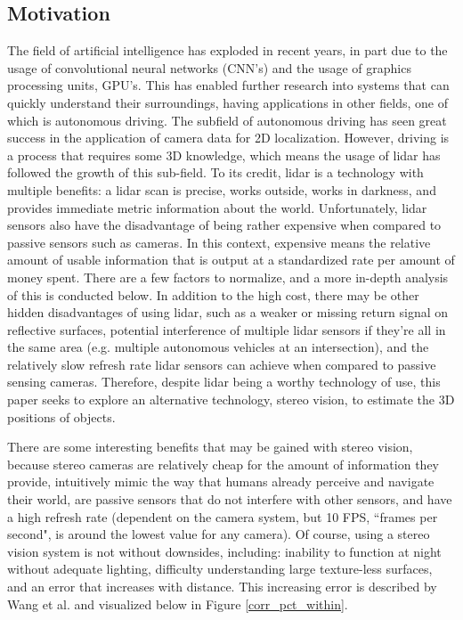 \subsection{Motivation}
The field of artificial intelligence has exploded in recent years, in part due to the usage of convolutional neural networks (CNN's) and the usage of graphics processing units, GPU's. This has enabled further research into systems that can quickly understand their surroundings, having applications in other fields, one of which is autonomous driving. The subfield of autonomous driving has seen great success in the application of camera data for 2D localization. However, driving is a process that requires some 3D knowledge, which means the usage of lidar has followed the growth of this sub-field. To its credit, lidar is a technology with multiple benefits: a lidar scan is precise, works outside, works in darkness, and provides immediate metric information about the world. Unfortunately, lidar sensors also have the disadvantage of being rather expensive when compared to passive sensors such as cameras. In this context, expensive means the relative amount of usable information that is output at a standardized rate per amount of money spent. There are a few factors to normalize, and a more in-depth analysis of this is conducted below. In addition to the high cost, there may be other hidden disadvantages of using lidar, such as a weaker or missing return signal on reflective surfaces, potential interference of multiple lidar sensors if they're all in the same area (e.g. multiple autonomous vehicles at an intersection), and the relatively slow refresh rate lidar sensors can achieve when compared to passive sensing cameras. Therefore, despite lidar being a worthy technology of use, this paper seeks to explore an alternative technology, stereo vision, to estimate the 3D positions of objects.

There are some interesting benefits that may be gained with stereo vision, because stereo cameras are relatively cheap for the amount of information they provide, intuitively mimic the way that humans already perceive and navigate their world, are passive sensors that do not interfere with other sensors, and have a high refresh rate (dependent on the camera system, but 10 FPS, ``frames per second", is around the lowest value for any camera). Of course, using a stereo vision system is not without downsides, including: inability to function at night without adequate lighting, difficulty understanding large texture-less surfaces, and an error that increases with distance. This increasing error is described by Wang et al. \cite{wang_pseudo-lidar_2019} and visualized below in Figure \ref{corr_pct_within}.

